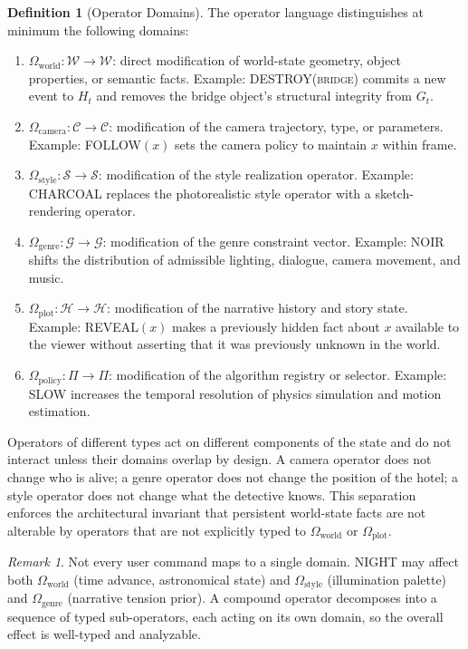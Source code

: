 \documentclass[12pt,a4paper]{article}
\theoremstyle{plain}
\theoremstyle{definition}
\newtheorem{definition}[theorem]{Definition}
\theoremstyle{remark}
\newtheorem{remark}[theorem]{Remark}
\begin{document}
\begin{definition}[Operator Domains]
The operator language distinguishes at minimum the following domains:
\begin{enumerate}[leftmargin=2em,itemsep=0pt]
\item $\Omega_{\mathrm{world}} : \mathcal{W} \to \mathcal{W}$: direct modification of world-state geometry, object properties, or semantic facts. Example: \textsc{DESTROY(bridge)} commits a new event to $H_t$ and removes the bridge object's structural integrity from $G_t$.
\item $\Omega_{\mathrm{camera}} : \mathcal{C} \to \mathcal{C}$: modification of the camera trajectory, type, or parameters. Example: \textsc{FOLLOW}$(x)$ sets the camera policy to maintain $x$ within frame.
\item $\Omega_{\mathrm{style}} : \mathcal{S} \to \mathcal{S}$: modification of the style realization operator. Example: \textsc{CHARCOAL} replaces the photorealistic style operator with a sketch-rendering operator.
\item $\Omega_{\mathrm{genre}} : \mathcal{G} \to \mathcal{G}$: modification of the genre constraint vector. Example: \textsc{NOIR} shifts the distribution of admissible lighting, dialogue, camera movement, and music.
\item $\Omega_{\mathrm{plot}} : \mathcal{H} \to \mathcal{H}$: modification of the narrative history and story state. Example: \textsc{REVEAL}$(x)$ makes a previously hidden fact about $x$ available to the viewer without asserting that it was previously unknown in the world.
\item $\Omega_{\mathrm{policy}} : \Pi \to \Pi$: modification of the algorithm registry or selector. Example: \textsc{SLOW} increases the temporal resolution of physics simulation and motion estimation.
\end{enumerate}
\end{definition}

Operators of different types act on different components of the state and do not interact unless their domains overlap by design. A camera operator does not change who is alive; a genre operator does not change the position of the hotel; a style operator does not change what the detective knows. This separation enforces the architectural invariant that persistent world-state facts are not alterable by operators that are not explicitly typed to $\Omega_{\mathrm{world}}$ or $\Omega_{\mathrm{plot}}$.

\begin{remark}
Not every user command maps to a single domain. \textsc{NIGHT} may affect both $\Omega_{\mathrm{world}}$ (time advance, astronomical state) and $\Omega_{\mathrm{style}}$ (illumination palette) and $\Omega_{\mathrm{genre}}$ (narrative tension prior). A compound operator decomposes into a sequence of typed sub-operators, each acting on its own domain, so the overall effect is well-typed and analyzable.
\end{remark}
\end{document}
